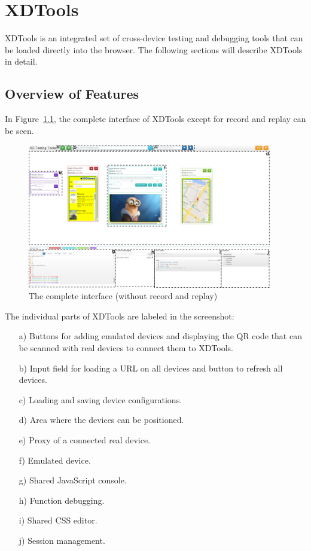 \chapter{XDTools}

XDTools is an integrated set of cross-device testing and debugging tools that can be loaded directly into the browser. The following sections will describe XDTools in detail.

\section{Overview of Features}

In Figure~\ref{fig:complete}, the complete interface of XDTools except for record and replay can be seen.

\begin{figure}[H]
  \centering
    \includegraphics[width=0.95\textwidth]{images/screenshots/complete_3.png}
	\caption[Screenshot: Complete Interface]{The complete interface (without record and replay)}
	\label{fig:complete}
\end{figure}

The individual parts of XDTools are labeled in the screenshot:
\begin{itemize}
	\item [a)] Buttons for adding emulated devices and displaying the QR code that can be scanned with real devices to connect them to XDTools.
	\item [b)] Input field for loading a URL on all devices and button to refresh all devices.
	\item [c)] Loading and saving device configurations.
	\item [d)] Area where the devices can be positioned.
	\item [e)] Proxy of a connected real device.
	\item [f)] Emulated device.
	\item [g)] Shared JavaScript console.
	\item [h)] Function debugging.
	\item [i)] Shared CSS editor.
	\item [j)] Session management.
\end{itemize}

